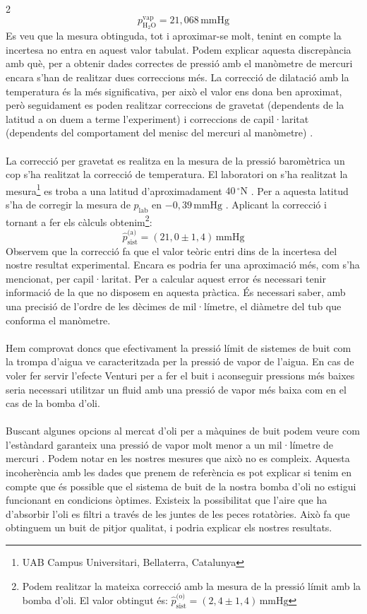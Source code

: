 \documentclass[12pt,twosides,onecolumn,openany]{article}
\begin{document}
\begin{multicols}{2}
\begin{equation*}
    p_{\text{H}_2\text{O}}^{\text{vap}}= 21,068 \,\text{mmHg}
\end{equation*}
Es veu que la mesura obtinguda, tot i aproximar-se molt, tenint en compte la incertesa no entra en aquest valor tabulat. Podem explicar aquesta discrepància amb què, per a obtenir dades correctes de pressió amb el manòmetre de mercuri encara s'han de realitzar dues correccions més. La correcció de dilatació amb la temperatura és la més significativa, per això el valor ens dona ben aproximat, però seguidament es poden realitzar correccions de gravetat (dependents de la latitud a on duem a terme l'experiment) i correccions de capil·laritat (dependents del comportament del menisc del mercuri al manòmetre) \cite{llibre_lab}.\\\\
La correcció per gravetat es realitza en la mesura de la pressió baromètrica un cop s'ha realitzat la correcció de temperatura. El laboratori on s'ha realitzat la mesura\footnote{UAB Campus Universitari, Bellaterra, Catalunya} es troba a una latitud d'aproximadament \(40 \,^\circ\text{N}\) \cite{IGN}. Per a aquesta latitud s'ha de corregir la mesura de $p_{\text{lab}}$ en \(-0,39 \, \text{mmHg}\) \cite{llibre_lab}. Aplicant la correcció i tornant a fer els càlculs obtenim\footnote{Podem realitzar la mateixa correcció amb la mesura de la pressió límit amb la bomba d'oli. El valor obtingut és: \(\hat{p}_{\text{sist}}^{\text{(o)}} = (2,4\pm1,4) \, \text{mmHg}\)}: 
\begin{equation*}
    \hat{p}_{\text{sist}}^{\text{(a)}} = (21,0\pm1,4) \, \text{mmHg}
\end{equation*}
Observem que la correcció fa que el valor teòric entri dins de la incertesa del nostre resultat experimental. Encara es podria fer una aproximació més, com s'ha mencionat, per capil·laritat. Per a calcular aquest error és necessari tenir informació de la que no disposem en aquesta pràctica. És necessari saber, amb una precisió de l'ordre de les dècimes de mil·límetre, el diàmetre del tub que conforma el manòmetre.\\\\
Hem comprovat doncs que efectivament la pressió límit de sistemes de buit com la trompa d'aigua ve caracteritzada per la pressió de vapor de l'aigua. En cas de voler fer servir l'efecte Venturi per a fer el buit i aconseguir pressions més baixes seria necessari utilitzar un fluid amb una pressió de vapor més baixa com en el cas de la bomba d'oli.\\\\
Buscant algunes opcions al mercat d'oli per a màquines de buit podem veure com l'estàndard garanteix una pressió de vapor molt menor a un mil·límetre de mercuri \cite{feroca}\cite{shell}. Podem notar en les nostres mesures que això no es compleix. Aquesta incoherència amb les dades que prenem de referència es pot explicar si tenim en compte que és possible que el sistema de buit de la nostra bomba d'oli no estigui funcionant en condicions òptimes. Existeix la possibilitat que l'aire que ha d'absorbir l'oli es filtri a través de les juntes de les peces rotatòries. Això fa que obtinguem un buit de pitjor qualitat, i podria explicar els nostres resultats.

\end{multicols}
\end{document}
